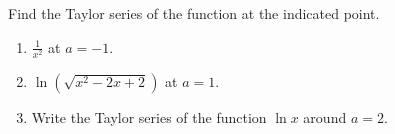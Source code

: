 Find the Taylor series of the function at the indicated point.
\begin{enumerate}[ref={\fcProblemRef}]
\item  $\frac{1}{x^2}$ at $a=-1$.


\item \label{problemTaylorSeries a=1 ln(sqrt(x^2-2x+2))}
$\ln \left( \sqrt{x^2-2x+2} \right)$ at $a=1$.


\item \label{problemTaylorlnxarounda=2}
Write the Taylor series of the function $\ln x$ around $a=2$.

\end{enumerate}

